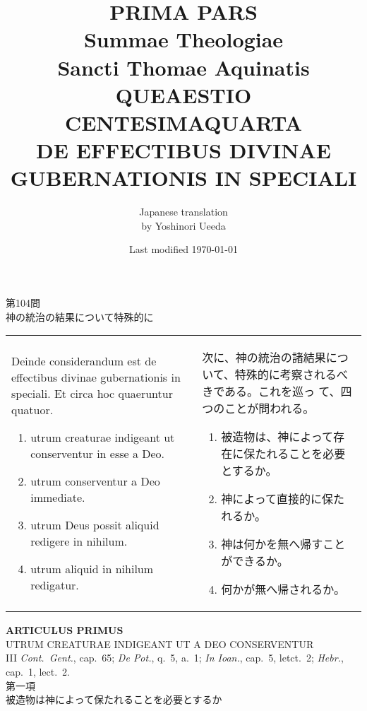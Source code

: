 \documentclass[10pt]{jsarticle} %
\title{{\bf PRIMA PARS}\\{\HUGE Summae Theologiae}\\Sancti Thomae
Aquinatis\\{\sffamily QUEAESTIO CENTESIMAQUARTA}\\DE EFFECTIBUS DIVINAE
GUBERNATIONIS IN SPECIALI}
\author{Japanese translation\\by Yoshinori {\sc Ueeda}}
\date{Last modified \today}
\begin{document}
\maketitle
\pagestyle{fancy}

\begin{center}
{\Large 第104問\\神の統治の結果について特殊的に}\\

\end{center}

\begin{longtable}{p{21em}p{21em}}

Deinde considerandum est de effectibus divinae
 gubernationis in speciali. Et circa hoc quaeruntur quatuor. 

\begin{enumerate}
 \item utrum creaturae indigeant ut conserventur in esse a Deo.
 \item utrum conserventur a Deo immediate.
 \item utrum Deus possit aliquid redigere in nihilum.
 \item utrum aliquid in nihilum redigatur.
\end{enumerate}


&

次に、神の統治の諸結果について、特殊的に考察されるべきである。これを巡っ
 て、四つのことが問われる。

\begin{enumerate}
 \item 被造物は、神によって存在に保たれることを必要とするか。
 \item 神によって直接的に保たれるか。
 \item 神は何かを無へ帰すことができるか。
 \item 何かが無へ帰されるか。
\end{enumerate}

\end{longtable}
\newpage
{}
\begin{center}
 {\Large {\bf ARTICULUS PRIMUS}}\\
 {\large UTRUM CREATURAE INDIGEANT UT A DEO CONSERVENTUR}\\
 {\footnotesize III {\itshape Cont.~Gent.}, cap.~65; {\itshape De Pot.},
 q.~5, a.~1; {\itshape In Ioan.}, cap.~5, letct.~2; {\itshape Hebr.},
 cap.~1, lect.~2.}\\
 {\Large 第一項\\被造物は神によって保たれることを必要とするか}
\end{center}
\end{document}
